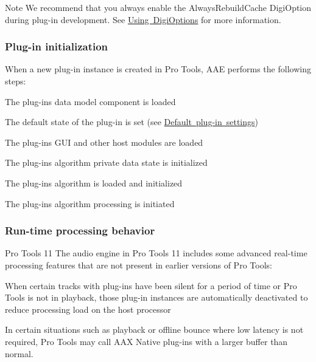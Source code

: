 \begin{DoxyNote}{Note}
We recommend that you always enable the {\ttfamily Always\+Rebuild\+Cache} Digi\+Option during plug-\/in development. See \mbox{\hyperlink{a00830_aax_pro_tools_guide_06c_digioptions}{Using Digi\+Options}} for more information.
\end{DoxyNote}
\hypertarget{a00830_subsection__plugin_initialization}{}\subsubsection{Plug-\/in initialization}\label{a00830_subsection__plugin_initialization}
 When a new plug-\/in instance is created in Pro Tools, A\+AE performs the following steps\+: 
\begin{DoxyEnumerate}
\item The plug-\/in\textquotesingle{}s data model component is loaded  
\item The default state of the plug-\/in is set (see \mbox{\hyperlink{a00830_subsubsection__default_plugin_settings_}{Default plug-\/in settings}})  
\item The plug-\/in\textquotesingle{}s G\+UI and other host modules are loaded  
\item The plug-\/in\textquotesingle{}s algorithm private data state is initialized  
\item The plug-\/in\textquotesingle{}s algorithm is loaded and initialized  
\item The plug-\/in\textquotesingle{}s algorithm processing is initiated 
\end{DoxyEnumerate}

\hypertarget{a00830_subsection__runtime_processing_behavior}{}\subsubsection{Run-\/time processing behavior}\label{a00830_subsection__runtime_processing_behavior}
  Pro Tools 11 The audio engine in Pro Tools 11 includes some advanced real-\/time processing features that are not present in earlier versions of Pro Tools\+:


\begin{DoxyItemize}
\item When certain tracks with plug-\/ins have been silent for a period of time or Pro Tools is not in playback, those plug-\/in instances are automatically deactivated to reduce processing load on the host processor  
\item In certain situations such as playback or offline bounce where low latency is not required, Pro Tools may call A\+AX Native plug-\/ins with a larger buffer than normal. 
\end{DoxyItemize}

